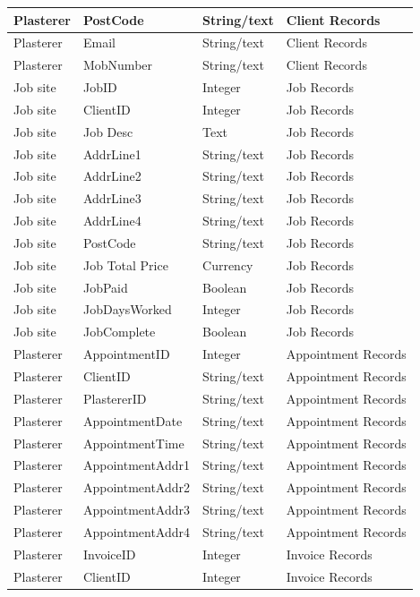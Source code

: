 \begin{flushleft}
\begin{longtable}{|p{3cm}|p{4cm}|p{3cm}|p{3cm}|}
Plasterer & PostCode  & String/text & Client Records \\ \hline
Plasterer & Email     & String/text & Client Records \\ \hline
Plasterer & MobNumber & String/text & Client Records \\ \hline   
Job site & JobID & Integer & Job Records \\ \hline
Job site & ClientID & Integer & Job Records \\ \hline
Job site & Job Desc & Text & Job Records \\ \hline
Job site & AddrLine1 & String/text & Job Records \\ \hline
Job site & AddrLine2 & String/text & Job Records \\ \hline
Job site & AddrLine3 & String/text & Job Records \\ \hline
Job site & AddrLine4 & String/text & Job Records \\ \hline
Job site & PostCode  & String/text & Job Records \\ \hline
Job site & Job Total Price & Currency & Job Records \\ \hline
Job site & JobPaid     & Boolean & Job Records \\ \hline
Job site & JobDaysWorked & Integer & Job Records \\ \hline
Job site & JobComplete & Boolean & Job Records \\ \hline   
Plasterer & AppointmentID & Integer & Appointment Records \\ \hline
Plasterer & ClientID & String/text & Appointment Records \\ \hline 
Plasterer & PlastererID & String/text & Appointment Records \\ \hline
Plasterer & AppointmentDate & String/text & Appointment Records \\ \hline
Plasterer & AppointmentTime & String/text & Appointment Records \\ \hline
Plasterer & AppointmentAddr1 & String/text & Appointment Records \\ \hline
Plasterer & AppointmentAddr2 & String/text & Appointment Records \\ \hline
Plasterer & AppointmentAddr3 & String/text & Appointment Records \\ \hline
Plasterer & AppointmentAddr4 & String/text & Appointment Records \\ \hline
Plasterer & InvoiceID & Integer & Invoice Records \\ \hline
Plasterer & ClientID	& Integer & Invoice Records \\ \hline

\end{longtable}
\end{flushleft}
